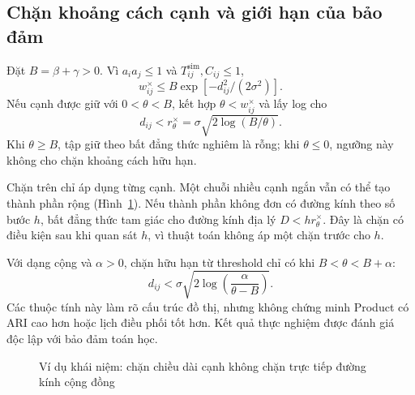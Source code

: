 \subsection{Chặn khoảng cách cạnh và giới hạn của bảo đảm}
Đặt $B=\beta+\gamma>0$. Vì $a_ia_j\leq1$ và $T_{ij}^{\mathrm{sim}},C_{ij}\leq1$,
\begin{equation}
 w_{ij}^{\times}\leq B\exp[-d_{ij}^2/(2\sigma^2)].
 \label{eq:edge-upper}
\end{equation}
Nếu cạnh được giữ với $0<\theta<B$, kết hợp $\theta<w_{ij}^{\times}$ và lấy log cho
\begin{equation}
 d_{ij}<r_{\theta}^{\times}=\sigma\sqrt{2\log(B/\theta)}.
 \label{eq:edge-radius}
\end{equation}
Khi $\theta\geq B$, tập giữ theo bất đẳng thức nghiêm là rỗng; khi $\theta\leq0$, ngưỡng này không cho chặn khoảng cách hữu hạn.

Chặn trên chỉ áp dụng từng cạnh. Một chuỗi nhiều cạnh ngắn vẫn có thể tạo thành phần rộng (Hình~\ref{fig:edge-chain}). Nếu thành phần không đơn có đường kính theo số bước $h$, bất đẳng thức tam giác cho đường kính địa lý $D<hr_{\theta}^{\times}$. Đây là chặn có điều kiện sau khi quan sát $h$, vì thuật toán không áp một chặn trước cho $h$.

Với dạng cộng và $\alpha>0$, chặn hữu hạn từ threshold chỉ có khi $B<\theta<B+\alpha$:
\begin{equation}
 d_{ij}<\sigma\sqrt{2\log\!\left(\frac{\alpha}{\theta-B}\right)}.
 \label{eq:additive-bound}
\end{equation}
Các thuộc tính này làm rõ cấu trúc đồ thị, nhưng không chứng minh Product có ARI cao hơn hoặc lịch điều phối tốt hơn. Kết quả thực nghiệm được đánh giá độc lập với bảo đảm toán học.

\begin{figure}[htbp]\centering
{}
\caption{Ví dụ khái niệm: chặn chiều dài cạnh không chặn trực tiếp đường kính cộng đồng}
\label{fig:edge-chain}
\end{figure}

